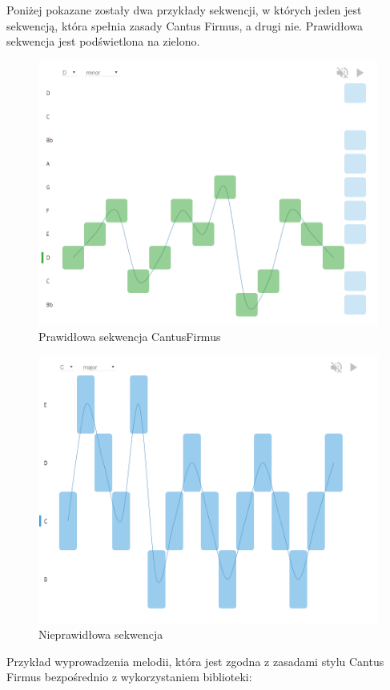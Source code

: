Poniżej pokazane zostały dwa przykłady sekwencji, w których jeden jest sekwencją, która spełnia zasady Cantus Firmus, a drugi nie. Prawidłowa sekwencja jest podświetlona na zielono.

\begin{figure}[H]
	\centering
	\includegraphics[width=0.7\linewidth]{music_machine_correct}
	\caption{Prawidłowa sekwencja CantusFirmus}
	\label{fig:musicmachinecorrect}
\end{figure}

\begin{figure}[H]
	\centering
	\includegraphics[width=0.7\linewidth]{music_machine_error}
	\caption{Nieprawidłowa sekwencja}
	\label{fig:musicmachineerror}
\end{figure}

Przykład wyprowadzenia melodii, która jest zgodna z zasadami stylu Cantus Firmus bezpośrednio z wykorzystaniem biblioteki:

